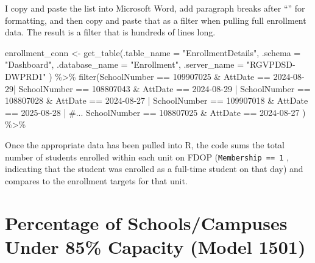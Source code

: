 \documentclass[
  letterpaper,
  DIV=11,
  numbers=noendperiod]{scrreprt}
\newenvironment{Shaded}{\begin{snugshade}}{\end{snugshade}}
\newcommand{\AttributeTok}[1]{\textcolor[rgb]{0.40,0.45,0.13}{#1}}
\newcommand{\CommentTok}[1]{\textcolor[rgb]{0.37,0.37,0.37}{#1}}
\newcommand{\DecValTok}[1]{\textcolor[rgb]{0.68,0.00,0.00}{#1}}
\newcommand{\FunctionTok}[1]{\textcolor[rgb]{0.28,0.35,0.67}{#1}}
\newcommand{\NormalTok}[1]{\textcolor[rgb]{0.00,0.23,0.31}{#1}}
\newcommand{\OtherTok}[1]{\textcolor[rgb]{0.00,0.23,0.31}{#1}}
\newcommand{\SpecialCharTok}[1]{\textcolor[rgb]{0.37,0.37,0.37}{#1}}
\newcommand{\StringTok}[1]{\textcolor[rgb]{0.13,0.47,0.30}{#1}}
\begin{document}
I copy and paste the list into Microsoft Word, add paragraph breaks
after ``\textbar{}'' for formatting, and then copy and paste that as a
filter when pulling full enrollment data. The result is a filter that is
hundreds of lines long.

\begin{Shaded}
\begin{Highlighting}[]
\NormalTok{enrollment\_conn }\OtherTok{\textless{}{-}} \FunctionTok{get\_table}\NormalTok{(}\AttributeTok{.table\_name =} \StringTok{"EnrollmentDetails"}\NormalTok{,}
                             \AttributeTok{.schema =} \StringTok{"Dashboard"}\NormalTok{,}
                             \AttributeTok{.database\_name =} \StringTok{"Enrollment"}\NormalTok{,}
                             \AttributeTok{.server\_name =} \StringTok{"RGVPDSD{-}DWPRD1"}
\NormalTok{                            ) }\SpecialCharTok{\%\textgreater{}\%}
  \FunctionTok{filter}\NormalTok{(SchoolNumber }\SpecialCharTok{==} \DecValTok{109907025} \SpecialCharTok{\&}\NormalTok{ AttDate }\SpecialCharTok{==} \StringTok{\textquotesingle{}2024{-}08{-}29\textquotesingle{}}\SpecialCharTok{|}
\NormalTok{         SchoolNumber }\SpecialCharTok{==} \DecValTok{108807043} \SpecialCharTok{\&}\NormalTok{ AttDate }\SpecialCharTok{==} \StringTok{\textquotesingle{}2024{-}08{-}29\textquotesingle{}} \SpecialCharTok{|}
\NormalTok{         SchoolNumber }\SpecialCharTok{==} \DecValTok{108807028} \SpecialCharTok{\&}\NormalTok{ AttDate }\SpecialCharTok{==} \StringTok{\textquotesingle{}2024{-}08{-}27\textquotesingle{}} \SpecialCharTok{|}
\NormalTok{         SchoolNumber }\SpecialCharTok{==} \DecValTok{109907018} \SpecialCharTok{\&}\NormalTok{ AttDate }\SpecialCharTok{==} \StringTok{\textquotesingle{}2025{-}08{-}28\textquotesingle{}} \SpecialCharTok{|} 
         \CommentTok{\#...}
\NormalTok{         SchoolNumber }\SpecialCharTok{==} \DecValTok{108807025} \SpecialCharTok{\&}\NormalTok{ AttDate }\SpecialCharTok{==} \StringTok{\textquotesingle{}2024{-}08{-}27\textquotesingle{}}
\NormalTok{        ) }\SpecialCharTok{\%\textgreater{}\%} 
\end{Highlighting}
\end{Shaded}

Once the appropriate data has been pulled into R, the code sums the
total number of students enrolled within each unit on FDOP
(\texttt{Membership\ ==\ 1} , indicating that the student was enrolled
as a full-time student on that day) and compares to the enrollment
targets for that unit.

\section{Percentage of Schools/Campuses Under 85\% Capacity (Model
1501)}\label{sec-06Cap}
\end{document}
